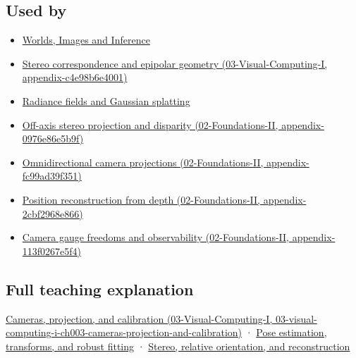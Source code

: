 \subsection{Used by}\label{appendix-3ee9861904d5-used-by}

\begin{itemize}
\item
  \href{Continuous\%20Notes/University\%20-\%20Worlds,\%20Images\%20and\%20Inference\%20-\%20Graphics,\%20Vision\%20and\%20Photography}{Worlds, Images and Inference}
\item
  \href{../03-Visual-Computing-I/main.pdf\#nameddest=appendix-c4e98b6e4001}{Stereo correspondence and epipolar geometry (03-Visual-Computing-I, appendix-c4e98b6e4001)}
\item
  \hyperref[appendix-c5b332e400e7]{Radiance fields and Gaussian splatting}
\item
  \href{../02-Foundations-II/main.pdf\#nameddest=appendix-0976e86e5b9f}{Off-axis stereo projection and disparity (02-Foundations-II, appendix-0976e86e5b9f)}
\item
  \href{../02-Foundations-II/main.pdf\#nameddest=appendix-fc99ad39f351}{Omnidirectional camera projections (02-Foundations-II, appendix-fc99ad39f351)}
\item
  \href{../02-Foundations-II/main.pdf\#nameddest=appendix-2cbf2968e866}{Position reconstruction from depth (02-Foundations-II, appendix-2cbf2968e866)}
\item
  \href{../02-Foundations-II/main.pdf\#nameddest=appendix-113f0267e5f4}{Camera gauge freedoms and observability (02-Foundations-II, appendix-113f0267e5f4)}
\end{itemize}

\subsection{Full teaching explanation}\label{appendix-3ee9861904d5-full-teaching-explanation}

\href{../03-Visual-Computing-I/main.pdf\#nameddest=03-visual-computing-i-ch003-cameras-projection-and-calibration}{Cameras, projection, and calibration (03-Visual-Computing-I, 03-visual-computing-i-ch003-cameras-projection-and-calibration)} · \hyperref[04-visual-computing-ii-ch032-pose-estimation-transforms-and-robust-fitting]{Pose estimation, transforms, and robust fitting} · \hyperref[04-visual-computing-ii-ch032-stereo-relative-orientation-and-reconstruction]{Stereo, relative orientation, and reconstruction}

